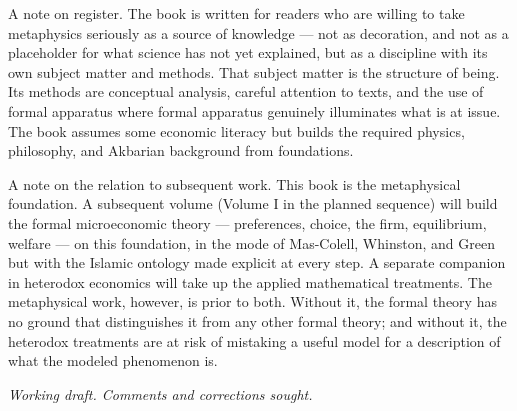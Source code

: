 A note on register. The book is written for readers who are willing to
take metaphysics seriously as a source of knowledge --- not as
decoration, and not as a placeholder for what science has not yet
explained, but as a discipline with its own subject matter and methods.
That subject matter is the structure of being. Its methods are
conceptual analysis, careful attention to texts, and the use of formal
apparatus where formal apparatus genuinely illuminates what is at issue.
The book assumes some economic literacy but builds the required physics,
philosophy, and Akbarian background from foundations.

A note on the relation to subsequent work. This book is the
metaphysical foundation. A subsequent volume (Volume I in the planned
sequence) will build the formal microeconomic theory --- preferences,
choice, the firm, equilibrium, welfare --- on this foundation, in the
mode of Mas-Colell, Whinston, and Green but with the Islamic ontology
made explicit at every step. A separate companion in heterodox economics
will take up the applied mathematical treatments. The metaphysical
work, however, is prior to both. Without it, the formal theory has no
ground that distinguishes it from any other formal theory; and without
it, the heterodox treatments are at risk of mistaking a useful model for
a description of what the modeled phenomenon is.

\vspace{1em}
\noindent\textit{Working draft. Comments and corrections sought.}
